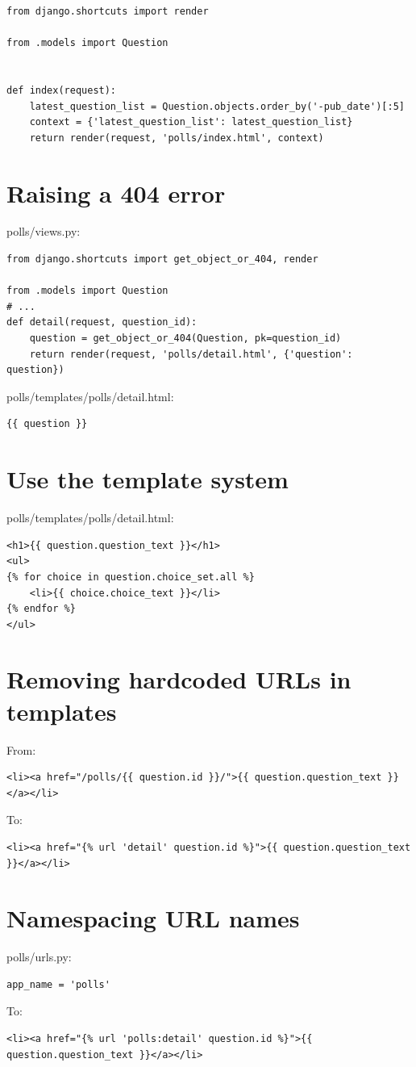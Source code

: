 \begin{lstlisting}
from django.shortcuts import render

from .models import Question


def index(request):
    latest_question_list = Question.objects.order_by('-pub_date')[:5]
    context = {'latest_question_list': latest_question_list}
    return render(request, 'polls/index.html', context)
\end{lstlisting}


\section{Raising a 404 error}
polls/views.py:
\begin{lstlisting}
from django.shortcuts import get_object_or_404, render

from .models import Question
# ...
def detail(request, question_id):
    question = get_object_or_404(Question, pk=question_id)
    return render(request, 'polls/detail.html', {'question': question})
  \end{lstlisting}


polls/templates/polls/detail.html:
\begin{verbatim}
{{ question }}
\end{verbatim}
  

\section{Use the template system}

polls/templates/polls/detail.html:
\begin{verbatim}
<h1>{{ question.question_text }}</h1>
<ul>
{% for choice in question.choice_set.all %}
    <li>{{ choice.choice_text }}</li>
{% endfor %}
</ul>
\end{verbatim}

\section{Removing hardcoded URLs in templates}

From:
\begin{lstlisting}
<li><a href="/polls/{{ question.id }}/">{{ question.question_text }}</a></li>
\end{lstlisting}

To:
\begin{lstlisting}
<li><a href="{% url 'detail' question.id %}">{{ question.question_text }}</a></li>
\end{lstlisting}

\section{Namespacing URL names}

polls/urls.py:
\begin{lstlisting}
app_name = 'polls'
\end{lstlisting}

To:
\begin{lstlisting}
<li><a href="{% url 'polls:detail' question.id %}">{{ question.question_text }}</a></li>  
\end{lstlisting}


